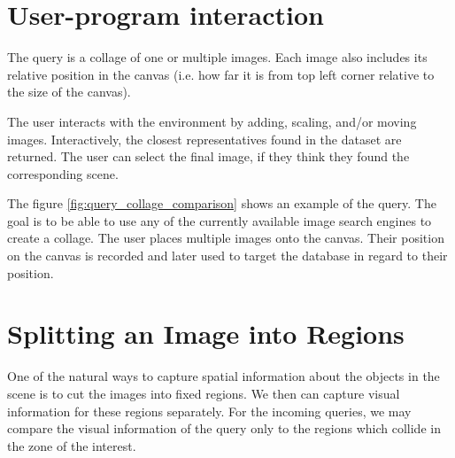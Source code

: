 \section{User-program interaction}

The query is a collage of one or multiple images. Each image also includes its relative position in the canvas (i.e. how far it is from top left corner relative to the size of the canvas).

The user interacts with the environment by adding, scaling, and/or moving images. Interactively, the closest representatives found in the dataset are returned. The user can select the final image, if they think they found the corresponding scene. 

The figure \ref{fig:query_collage_comparison} shows an example of the query. The goal is to be able to use any of the currently available image search engines to create a collage. The user places multiple images onto the canvas. Their position on the canvas is recorded and later used to target the database in regard to their position. 

\section{Splitting an Image into Regions}






One of the natural ways to capture spatial information about the objects in the scene is to cut the images into fixed regions. We then can capture visual information for these regions separately. For the incoming queries, we may compare the visual information of the query only to the regions which collide in the zone of the interest.

